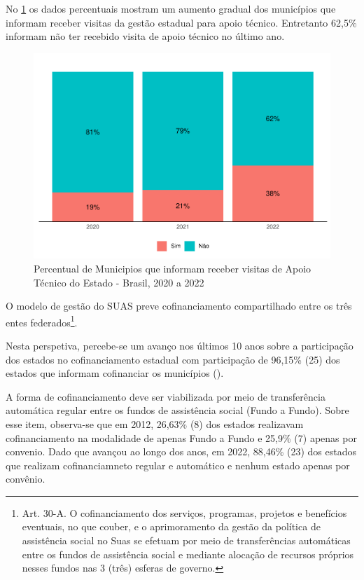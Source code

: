\documentclass[
  brazilian]{report}
\begin{document}
No \cref{fig:munic_vit_estadual} os dados percentuais mostram um aumento
gradual dos municípios que informam receber visitas da gestão estadual
para apoio técnico. Entretanto 62,5\% informam não ter recebido visita
de apoio técnico no último ano.

\begin{figure}
\includegraphics{Censo-SUAS-2022_files/figure-latex/munic_vit_estadual-1} \caption[Percentual de Municipios que informam receber visitas de Apoio Técnico do Estado - Brasil, 2020 a 2022]{Percentual de Municipios que informam receber visitas de Apoio Técnico do Estado - Brasil, 2020 a 2022}\label{fig:munic_vit_estadual}
\end{figure}

O modelo de gestão do SUAS preve cofinanciamento compartilhado entre os
três entes
federados\footnote{Art. 30-A.  O cofinanciamento dos serviços, programas, projetos e benefícios eventuais, no que couber, e o aprimoramento da gestão da política de assistência social no Suas se efetuam por meio de transferências automáticas entre os fundos de assistência social e mediante alocação de recursos próprios nesses fundos nas 3 (três) esferas de governo.}.

Nesta perspetiva, percebe-se um avanço nos últimos 10 anos sobre a
participação dos estados no cofinanciamento estadual com participação de
96,15\% (25) dos estados que informam cofinanciar os municípios
().

A forma de cofinanciamento deve ser viabilizada por meio de
transferência automática regular entre os fundos de assistência social
(Fundo a Fundo). Sobre esse item, observa-se que em 2012, 26,63\% (8)
dos estados realizavam cofinanciamento na modalidade de apenas Fundo a
Fundo e 25,9\% (7) apenas por convenio. Dado que avançou ao longo dos
anos, em 2022, 88,46\% (23) dos estados que realizam cofinanciamneto
regular e automático e nenhum estado apenas por convênio.
\end{document}
